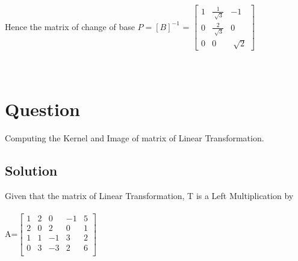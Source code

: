 \documentclass[12pt]{article}
\newcommand\tab[1][1cm]{\hspace*{#1}}
\begin{document}
\noindent
\tab Hence the matrix of change of base $P = [B]^{-1}$  =
\noindent
$\left[ \begin{array}{ccc}
   1 & \frac{1}{\sqrt[]{3}} & -1\\
   0 & \frac{2}{\sqrt[]{3}} & 0\\
   0 & 0 & \sqrt[]{2}
  \end{array} \right]$\\ \\ \\
\clearpage
\section{Question}
Computing the Kernel and Image of matrix of Linear Transformation.
\subsection{Solution}
\noindent
\tab Given that the matrix of Linear Transformation, T is a Left Multiplication by \\ \\ 
A=$\left[ \begin{array}{ccccc}
  1 & 2 & 0 & -1 & 5\\
  2 & 0 & 2 & 0 & 1\\
  1 & 1 & -1 & 3 & 2\\
  0 & 3 & -3 & 2 & 6\\
  \end{array} \right]$\\
\end{document}
